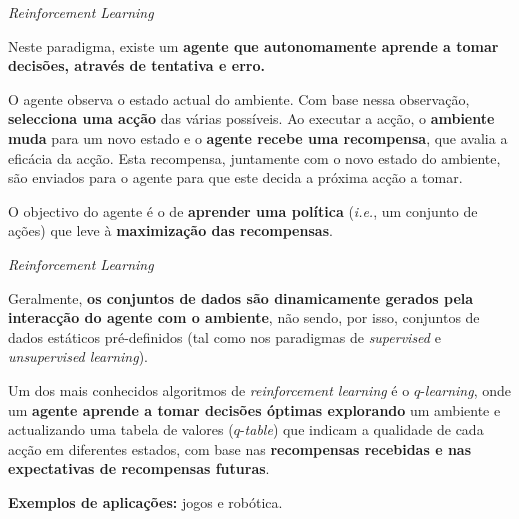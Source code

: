 \begin{frame}{\textit{Reinforcement Learning}}

Neste paradigma, existe um \textbf{agente que autonomamente aprende a tomar decisões, através de tentativa e erro.}

\pauseskip

O agente observa o estado actual do ambiente. Com base nessa observação, \textbf{selecciona uma acção} das várias possíveis. Ao executar a acção, o \textbf{ambiente muda} para um novo estado e o \textbf{agente recebe uma recompensa}, que avalia a eficácia da acção. Esta recompensa, juntamente com o novo estado do ambiente, são enviados para o agente para que este decida a próxima acção a tomar.

\pauseskip

O objectivo do agente é o de \textbf{aprender uma política} (\textit{i.e.}, um conjunto de ações) que leve à \textbf{maximização das recompensas}.

\end{frame}

\begin{frame}{\textit{Reinforcement Learning} \cont}

Geralmente, \textbf{os conjuntos de dados são dinamicamente gerados pela interacção do agente com o ambiente}, não sendo, por isso, conjuntos de dados estáticos pré-definidos (tal como nos paradigmas de \textit{supervised} e \textit{unsupervised learning}).

\pauseskip

Um dos mais conhecidos algoritmos de \textit{reinforcement learning} é o $q$-\textit{learning}, onde um \textbf{agente aprende a tomar decisões óptimas explorando} um ambiente e actualizando uma tabela de valores ($q$-\textit{table}) que indicam a qualidade de cada acção em diferentes estados, com base nas \textbf{recompensas recebidas e nas expectativas de recompensas futuras}.

\pauseskip

\textbf{Exemplos de aplicações:} jogos e robótica.

\end{frame}



